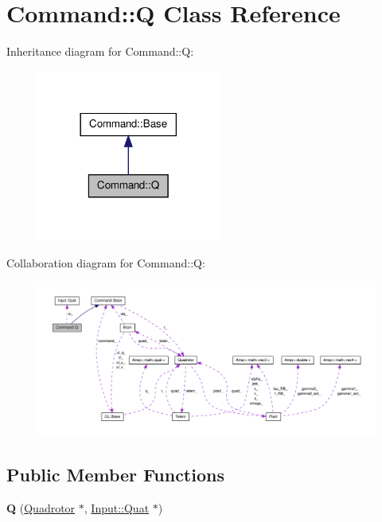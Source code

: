 \hypertarget{classCommand_1_1Q}{\section{\-Command\-:\-:\-Q \-Class \-Reference}
\label{classCommand_1_1Q}
}


\-Inheritance diagram for \-Command\-:\-:\-Q\-:\nopagebreak
\begin{figure}[H]
\begin{center}
\leavevmode
\includegraphics[width=170pt]{classCommand_1_1Q__inherit__graph}
\end{center}
\end{figure}


\-Collaboration diagram for \-Command\-:\-:\-Q\-:\nopagebreak
\begin{figure}[H]
\begin{center}
\leavevmode
\includegraphics[width=350pt]{classCommand_1_1Q__coll__graph}
\end{center}
\end{figure}
\subsection*{\-Public \-Member \-Functions}
\begin{DoxyCompactItemize}
\item 
\hypertarget{classCommand_1_1Q_a4eb218eafdd864d06a92afc16eb9fee9}{{\bfseries \-Q} (\hyperlink{classQuadrotor}{\-Quadrotor} $\ast$, \hyperlink{classInput_1_1Quat}{\-Input\-::\-Quat} $\ast$)}\label{classCommand_1_1Q_a4eb218eafdd864d06a92afc16eb9fee9}

\end{DoxyCompactItemize}
